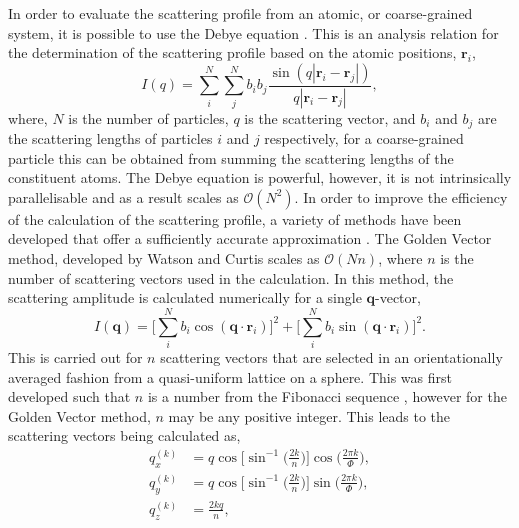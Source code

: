 In order to evaluate the scattering profile from an atomic, or coarse-grained system, it is possible to use the Debye equation \cite{debye_zerstreuung_1915}.
This is an analysis relation for the determination of the scattering profile based on the atomic positions, $\mathbf{r}_i$,
%
\begin{equation}
    I(q) = \sum_{i}^{N}\sum_{j}^{N} b_ib_j\frac{\sin{(q|\mathbf{r}_i-\mathbf{r}_j|)}}{q|\mathbf{r}_i-\mathbf{r}_j|},
\end{equation}
%
where, $N$ is the number of particles, $q$ is the scattering vector, and $b_i$ and $b_j$ are the scattering lengths of particles $i$ and $j$ respectively, for a coarse-grained particle this can be obtained from summing the scattering lengths of the constituent atoms.
The Debye equation is powerful, however, it is not intrinsically parallelisable and as a result scales as $\mathcal{O}(N^2)$.
In order to improve the efficiency of the calculation of the scattering profile, a variety of methods have been developed that offer a sufficiently accurate approximation \cite{svergun_solution_1994,watson_rapid_2013}.
The Golden Vector method, developed by Watson and Curtis \cite{watson_rapid_2013} scales as $\mathcal{O}(Nn)$, where $n$ is the number of scattering vectors used in the calculation.
In this method, the scattering amplitude is calculated numerically for a single $\mathbf{q}$-vector,
%
\begin{equation}
    I(\mathbf{q}) = \Bigg[\sum_{i}^{N}b_i\cos{(\mathbf{q}\cdot\mathbf{r}_i)}\Bigg]^2 + \Bigg[\sum_{i}^{N}b_i\sin{(\mathbf{q}\cdot\mathbf{r}_i)}\Bigg]^2.
\end{equation}
%
This is carried out for $n$ scattering vectors that are selected in an orientationally averaged fashion from a quasi-uniform lattice on a sphere.
This was first developed such that $n$ is a number from the Fibonacci sequence \cite{svergun_solution_1994}, however for the Golden Vector method, $n$ may be any positive integer.
This leads to the scattering vectors being calculated as,
%
\begin{equation}
    \begin{aligned}
        q_x^{(k)} & = q\cos\Bigg[\sin^{-1}\bigg(\frac{2k}{n}\bigg)\Bigg]\cos\bigg(\frac{2\pi k}{\Phi}\bigg), \\
        q_y^{(k)} & = q\cos\Bigg[\sin^{-1}\bigg(\frac{2k}{n}\bigg)\Bigg]\sin\bigg(\frac{2\pi k}{\Phi}\bigg), \\
        q_z^{(k)} & = \frac{2 k q}{n},
    \end{aligned}
\end{equation}
